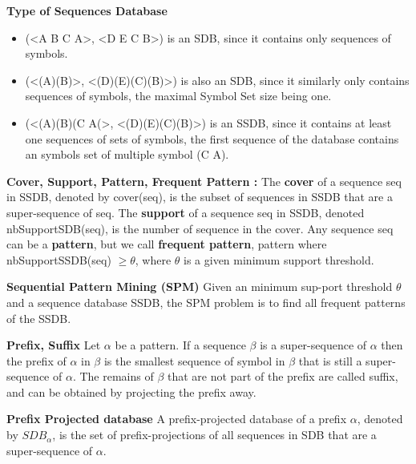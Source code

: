 \documentclass{eplmastersthesis}
\begin{document}
\begin{example}{\bfseries Type of Sequences Database}
\begin{itemize}
\item (<A B C A>, <D E C B>) is an SDB, since it contains only sequences of symbols.
\item (<(A)(B)>, <(D)(E)(C)(B)>) is also an SDB, since it similarly only contains sequences of symbols, the maximal Symbol Set size being one. 
\item (<(A)(B)(C A(>, <(D)(E)(C)(B)>) is an SSDB, since it contains at least one sequences of sets of symbols, the first sequence of the database contains an symbols set of multiple symbol (C A).
\end{itemize}
\end{example}

\begin{definition}{\bfseries Cover, Support, Pattern, Frequent Pattern :}
The \textbf{cover} of a sequence seq in SSDB, denoted by cover(seq), is the subset of sequences in SSDB that are a super-sequence of seq. 
The \textbf{support} of a sequence seq in SSDB, denoted nbSupportSDB(seq), is the number of sequence in the cover. 
Any sequence seq can be a \textbf{pattern}, but we call \textbf{frequent pattern}, pattern where nbSupportSSDB(seq) $\geq \theta$, where $\theta$ is a
given minimum support threshold.
\end{definition}

\begin{definition}{\bfseries Sequential Pattern Mining (SPM)}
Given an minimum sup-port threshold $\theta$ and a sequence database SSDB, the SPM problem is to find all frequent patterns of the SSDB.
\end{definition}

\begin{definition}{\bfseries Prefix, Suffix}
Let $\alpha$ be a pattern. If a sequence  $\beta$ is a super-sequence of $\alpha$ then the prefix of $\alpha$ in $\beta$ is the smallest sequence of symbol in $\beta$ that is still a super-sequence of $\alpha$. The remains of $\beta$ that are not part of the prefix are called suffix, and can be obtained by projecting the prefix away.
\end{definition}

\begin{definition}{\bfseries Prefix Projected database}
A prefix-projected database of a prefix $\alpha$, denoted by $SDB_\alpha$, is the set of prefix-projections of all sequences in SDB that are a super-sequence of $\alpha$.
\end{definition}
\end{document}
